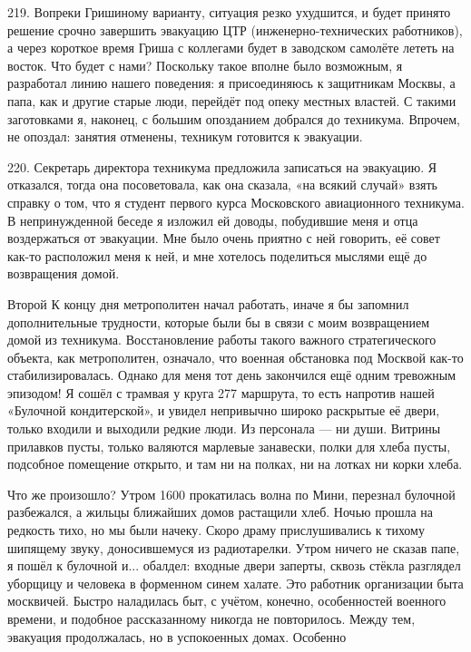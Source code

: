 219. Вопреки Гришиному варианту, ситуация резко ухудшится, и будет принято решение срочно завершить эвакуацию ЦТР (инженерно-технических работников), а через короткое время Гриша с коллегами будет в заводском самолёте лететь на восток. Что будет с нами? Поскольку такое вполне было возможным, я разработал линию нашего поведения: я присоединяюсь к защитникам Москвы, а папа, как и другие старые люди, перейдёт под опеку местных властей. С такими заготовками я, наконец, с большим опозданием добрался до техникума. Впрочем, не опоздал: занятия отменены, техникум готовится к эвакуации.

220. Секретарь директора техникума предложила записаться на эвакуацию. Я отказался, тогда она посоветовала, как она сказала, «на всякий случай» взять справку о том, что я студент первого курса Московского авиационного техникума. В непринужденной беседе я изложил ей доводы, побудившие меня и отца воздержаться от эвакуации. Мне было очень приятно с ней говорить, её совет как-то расположил меня к ней, и мне хотелось поделиться мыслями ещё до возвращения домой.

Второй
К концу дня метрополитен начал работать, иначе я бы запомнил дополнительные трудности, которые были бы в связи с моим возвращением домой из техникума. Восстановление работы такого важного стратегического объекта, как метрополитен, означало, что военная обстановка под Москвой как-то стабилизировалась. Однако для меня тот день закончился ещё одним тревожным эпизодом! Я сошёл с трамвая у круга 277 маршрута, то есть напротив нашей «Булочной кондитерской», и увидел непривычно широко раскрытые её двери, только входили и выходили редкие люди. Из персонала — ни души. Витрины прилавков пусты, только валяются марлевые занавески, полки для хлеба пусты, подсобное помещение открыто, и там ни на полках, ни на лотках ни корки хлеба.

Что же произошло? Утром 1600 прокатилась волна по Мини, перезнал булочной разбежался, а жильцы ближайших домов растащили хлеб. Ночью прошла на редкость тихо, но мы были начеку. Скоро драму прислушивались к тихому шипящему звуку, доносившемуся из радиотарелки. Утром ничего не сказав папе, я пошёл к булочной и... обалдел: входные двери заперты, сквозь стёкла разглядел уборщицу и человека в форменном синем халате. Это работник организации быта москвичей. Быстро наладилась быт, с учётом, конечно, особенностей военного времени, и подобное рассказанному никогда не повторилось. Между тем, эвакуация продолжалась, но в успокоенных домах. Особенно

